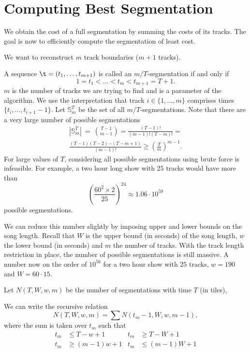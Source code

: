 \documentclass[twocolumn]{article}
\newcommand{\segs}{\mathbb S}
\begin{document}
	
	\section{Computing Best Segmentation}\label{best_cost}
	
	We obtain the cost of a full segmentation by summing the costs of its tracks. The goal is now to efficiently compute the segmentation of least cost.
	
	We want to reconstruct $m$ track boundaries ($m+1$ tracks).
	
	A sequence $\t = (t_1, \ldots, t_{m+1})$ is called an $m/T$-segmentation if and only if
	\[
	1 = t_1 < \ldots < t_m < t_{m+1} = T+1.
	\]
	$m$ is the number of tracks we are trying to find and is a parameter of the algorithm. We use the interpretation that track $i \in \{1, \ldots, m\}$ comprises times $\{t_i, \ldots, t_{i+1}-1\}$. Let $\segs^T_m$ be the set of all $m/T$-segmentations. Note that there are a very large number of possible segmentations 
	\begin{multline*}
		|\segs^T_m| ~=~ \binom{T-1}{m-1}
		= \frac{(T-1)!}{(m-1)!(T-m)!} =\\
		\frac{(T-1)(T-2)\cdots(T-m+1)}{(m-1)!} \ge \left( \frac{T}{m}\right)^{m-1}.
	\end{multline*} 
	For large values of $T$, considering all possible segmentations using brute force is infeasible. For example, a two hour long show with $25$ tracks would have more than 
	\[
	\left( \frac{60^2 \times 2}{25}\right)^{24}  \approx 1.06 \cdot 10^{59}
	\] possible segmentations. 
	
	We can reduce this number slightly by imposing upper and lower bounds on the song length.  Recall that $W$ is the upper bound (in seconds) of the song length, $w$ the lower bound (in seconds) and $m$ the number of tracks. With the track length restriction in place, the number of possible segmentations is still massive. A number now on the order of $10^{56}$ for a two hour show with $25$ tracks, $w=190$ and $W=60\cdot15$.
	
	Let $N(T,W,w,m)$ be the number of segmentations with time $T$ (in tiles),
	
	We can write the recursive relation $$N(T,W,w,m) = \sum N(t_m-1,W,w,m-1),$$ where the sum is taken over $t_m$ such that 
	\begin{align*}
		t_m &\le T-w+1 & t_m &\ge T-W+1\\
		t_m &\ge (m-1)w+1 & t_m &\le (m-1)W+1
	\end{align*}
	
\end{document}
